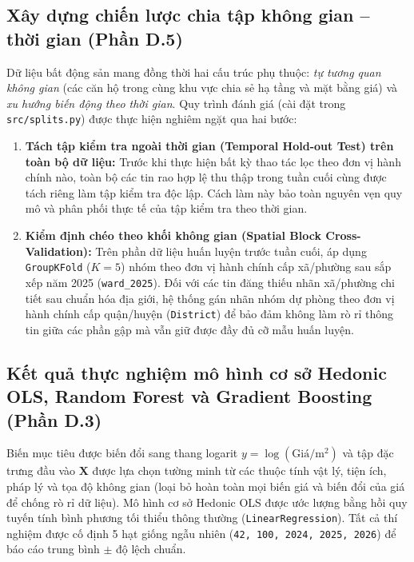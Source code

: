 \subsection{Xây dựng chiến lược chia tập không gian -- thời gian (Phần D.5)}
Dữ liệu bất động sản mang đồng thời hai cấu trúc phụ thuộc: \textit{tự tương quan không gian} (các căn hộ trong cùng khu vực chia sẻ hạ tầng và mặt bằng giá) và \textit{xu hướng biến động theo thời gian}. Quy trình đánh giá (cài đặt trong \texttt{src/splits.py}) được thực hiện nghiêm ngặt qua hai bước:
\begin{enumerate}
    \item \textbf{Tách tập kiểm tra ngoài thời gian (Temporal Hold-out Test) trên toàn bộ dữ liệu:} Trước khi thực hiện bất kỳ thao tác lọc theo đơn vị hành chính nào, toàn bộ các tin rao hợp lệ thu thập trong tuần cuối cùng được tách riêng làm tập kiểm tra độc lập. Cách làm này bảo toàn nguyên vẹn quy mô và phân phối thực tế của tập kiểm tra theo thời gian.
    \item \textbf{Kiểm định chéo theo khối không gian (Spatial Block Cross-Validation):} Trên phần dữ liệu huấn luyện trước tuần cuối, áp dụng \texttt{GroupKFold} ($K=5$) nhóm theo đơn vị hành chính cấp xã/phường sau sắp xếp năm 2025 (\texttt{ward\_2025}). Đối với các tin đăng thiếu nhãn xã/phường chi tiết sau chuẩn hóa địa giới, hệ thống gán nhãn nhóm dự phòng theo đơn vị hành chính cấp quận/huyện (\texttt{District}) để bảo đảm không làm rò rỉ thông tin giữa các phần gập mà vẫn giữ được đầy đủ cỡ mẫu huấn luyện.
\end{enumerate}

\subsection{Kết quả thực nghiệm mô hình cơ sở Hedonic OLS, Random Forest và Gradient Boosting (Phần D.3)}
Biến mục tiêu được biến đổi sang thang logarit $y = \log(\text{Giá}/\text{m}^2)$ và tập đặc trưng đầu vào $\mathbf{X}$ được lựa chọn tường minh từ các thuộc tính vật lý, tiện ích, pháp lý và tọa độ không gian (loại bỏ hoàn toàn mọi biến giá và biến đổi của giá để chống rò rỉ dữ liệu). Mô hình cơ sở Hedonic OLS được ước lượng bằng hồi quy tuyến tính bình phương tối thiểu thông thường (\texttt{LinearRegression}). Tất cả thí nghiệm được cố định 5 hạt giống ngẫu nhiên (\texttt{42, 100, 2024, 2025, 2026}) để báo cáo trung bình $\pm$ độ lệch chuẩn.

